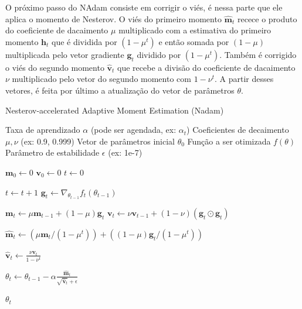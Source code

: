 O próximo passo do NAdam consiste em corrigir o viés, é nessa parte que ele aplica o momento de Nesterov. O viés do primeiro momento $\mathbf{\hat{m}}_t$ recece o produto do coeficiente de dacaimento $\mu$ multiplicado com a estimativa do primeiro momento $\mathbf{h}_t$ que é dividida por $(1 - \mu^t)$ e então somada por $(1 - \mu)$ multiplicada pelo vetor gradiente $\mathbf{g}_t$ dividido por $(1 - \mu^t)$. Também é corrigido o viés do segundo momento $\mathbf{\hat{v}}_t$ que recebe a divisão do coeficiente de dacaimento $\nu$ multiplicado pelo vetor do segundo momento com $1 - \nu^t$. A partir desses vetores, é feita por último a atualização do vetor de parâmetros $\theta$.

\begin{algorithm}[H]
    \caption{Nesterov-accelerated Adaptive Moment Estimation (Nadam)}
    \label{alg:nadam-estilizado}
    \begin{algorithmic}[1]

    \Require Taxa de aprendizado $\alpha$ (pode ser agendada, ex: $\alpha_t$)
    \Require Coeficientes de decaimento $\mu, \nu$ (ex: 0.9, 0.999)
    \Require Vetor de parâmetros inicial $\theta_0$
    \Require Função a ser otimizada $f(\theta)$
    \Require Parâmetro de estabilidade $\epsilon$ (ex: 1e-7)

    \State $\mathbf{m}_0 \leftarrow 0$ 
    \State $\mathbf{v}_0 \leftarrow 0$ 
    \State $t \leftarrow 0$ 

        \State $t \leftarrow t + 1$
        \State $\mathbf{g}_t \leftarrow \nabla_{\theta_{t-1}} f_t(\theta_{t-1})$
        
        \State $\mathbf{m}_t \leftarrow \mu \mathbf{m}_{t-1} + (1 - \mu) \mathbf{g}_t$
        \State $\mathbf{v}_t \leftarrow \nu \mathbf{v}_{t-1} + (1 - \nu) (\mathbf{g}_t \odot \mathbf{g}_t)$
        
        \State $\mathbf{\hat{m}}_t \leftarrow (\mu \mathbf{m}_t / (1 - \mu^t)) + ((1 - \mu) \mathbf{g}_t / (1 - \mu^t))$
        
        \State $\mathbf{\hat{v}}_t \leftarrow \frac{\nu \mathbf{v}_t}{1 - \nu^t}$
        
        \State $\theta_t \leftarrow \theta_{t-1} - \alpha \frac{\mathbf{\hat{m}}_t}{\sqrt{\mathbf{\hat{v}}_t} + \epsilon}$
    \EndWhile

    \State \Return $\theta_t$ 
    \end{algorithmic}
\end{algorithm}

